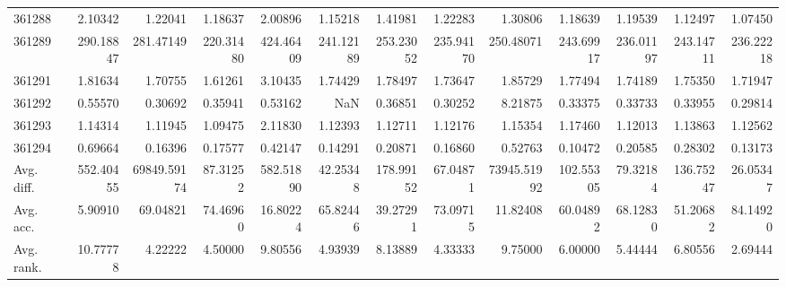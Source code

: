 \begin{tabular}{lrrrrrrrrrrrr}
361288 & 2.10342 & 1.22041 & 1.18637 & 2.00896 & 1.15218 & 1.41981 & 1.22283 & 1.30806 & 1.18639 & 1.19539 & 1.12497 & 1.07450 \\
361289 & 290.18847 & 281.47149 & 220.31480 & 424.46409 & 241.12189 & 253.23052 & 235.94170 & 250.48071 & 243.69917 & 236.01197 & 243.14711 & 236.22218 \\
361291 & 1.81634 & 1.70755 & 1.61261 & 3.10435 & 1.74429 & 1.78497 & 1.73647 & 1.85729 & 1.77494 & 1.74189 & 1.75350 & 1.71947 \\
361292 & 0.55570 & 0.30692 & 0.35941 & 0.53162 & NaN & 0.36851 & 0.30252 & 8.21875 & 0.33375 & 0.33733 & 0.33955 & 0.29814 \\
361293 & 1.14314 & 1.11945 & 1.09475 & 2.11830 & 1.12393 & 1.12711 & 1.12176 & 1.15354 & 1.17460 & 1.12013 & 1.13863 & 1.12562 \\
361294 & 0.69664 & 0.16396 & 0.17577 & 0.42147 & 0.14291 & 0.20871 & 0.16860 & 0.52763 & 0.10472 & 0.20585 & 0.28302 & 0.13173 \\
Avg. diff. & 552.40455 & 69849.59174 & 87.31252 & 582.51890 & 42.25348 & 178.99152 & 67.04871 & 73945.51992 & 102.55305 & 79.32184 & 136.75247 & 26.05347 \\
Avg. acc. & 5.90910 & 69.04821 & 74.46960 & 16.80224 & 65.82446 & 39.27291 & 73.09715 & 11.82408 & 60.04892 & 68.12830 & 51.20682 & 84.14920 \\
Avg. rank. & 10.77778 & 4.22222 & 4.50000 & 9.80556 & 4.93939 & 8.13889 & 4.33333 & 9.75000 & 6.00000 & 5.44444 & 6.80556 & 2.69444 \\
\bottomrule
\end{tabular}
